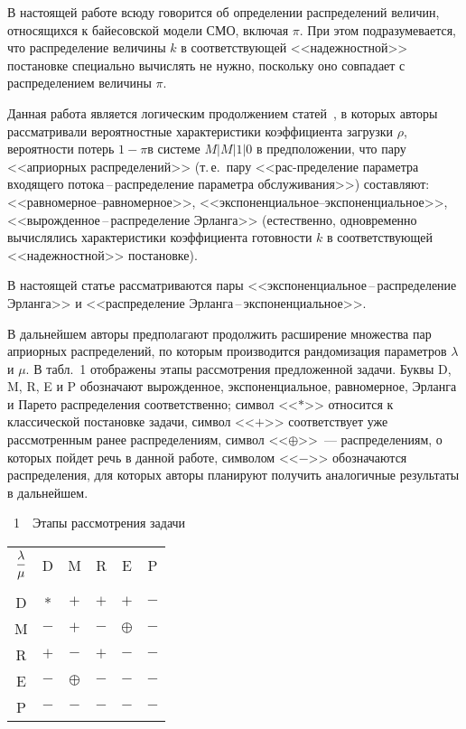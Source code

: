 \begin{multicols}{2}
В настоящей работе всюду говорится об определении распределений величин, относящихся к байесовской модели СМО, включая
$\pi$. При этом подразумевается, что распределение величины $k$ в соответствующей <<надежностной>> постановке
специально вычислять не нужно, поскольку оно совпадает с распределением величины $\pi$.

Данная работа является логическим продолжением статей~\cite{1k, 2k}, в которых авторы рассматривали вероятностные
характеристики коэффициента загрузки $\rho$, вероятности потерь
 $1-\pi$\linebreak в системе $M\vert M \vert 1 \vert 0$ в предположении, что пару
<<априорных распределений>> (т.\,е.\ пару <<рас-\linebreak пре\-де\-ле\-ние параметра входящего потока\,--\,рас\-пре\-де\-ле\-ние параметра
обслуживания>>) со\-став\-ля\-ют:\linebreak  <<рав\-но\-мер\-ное--рав\-но\-мер\-ное>>, <<экспо\-нен\-циаль\-ное--экспо\-нен\-ци\-аль\-ное>>, 
<<вы\-рож\-ден\-ное\,--\,рас\-пре\-де\-ле\-ние Эрланга>> (естественно, одновременно\linebreak
 вычислялись характеристики коэффициента готовности $k$ в
соответствующей <<надежностной>> постановке).

В настоящей статье рассматриваются пары  <<экспоненциальное\,--\,распределение Эрланга>> и 
<<распределение Эрланга\,--\,экспоненциальное>>.

В дальнейшем авторы предполагают продолжить расширение множества пар априорных распределений, по которым производится
рандомизация параметров $\lambda$ и $\mu$. В табл.~1 отображены этапы рассмотрения предложенной задачи. Буквы D, M,
R, E и P обозначают вырожденное, экспоненциальное, равномерное, Эрланга и Парето распределения соответственно; символ
<<$*$>> относится к классической постановке задачи, символ <<$+$>> соответствует уже рассмотренным ранее
распределениям, символ <<$\oplus$>>~--- распределениям, о которых пойдет речь в данной работе, символом <<$-$>>
обозначаются распределения, для которых авторы планируют получить аналогичные результаты в дальнейшем.

\vspace*{10pt}

 \noindent
{\centerline{{\tablename~1}\ \ \small{Этапы рассмотрения задачи}}}
\vspace*{1pt}

{\small
\begin{center}
\tabcolsep=10pt
\begin{tabular}{|c|c|c|c|c|c|}
\hline
$\displaystyle\frac{\displaystyle \lambda\mathstrut}{\displaystyle \mu\mathstrut}$&D&M&R&E&P\\
&&&&&\\[-9pt]
\hline
D&*&$+$&$+$&$+$&$-$\\
M&$-$&$+$&$-$&$\oplus$&$-$\\
R&$+$&$-$&$+$&$-$&$-$\\
E&$-$&$\oplus$&$-$&$-$&$-$\\
P&$-$&$-$&$-$&$-$&$-$\\
\hline
\end{tabular}
\end{center}
}


\end{multicols}
